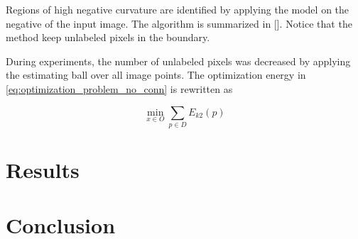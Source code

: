 \documentclass[runningheads]{llncs}
\begin{document}
		Regions of high negative curvature are identified by applying the model on the negative of the input image. The algorithm is summarized in []. Notice that the method keep unlabeled pixels in the boundary.
		
		During experiments, the number of unlabeled pixels was decreased by applying the estimating ball over all image points. The optimization energy in \eqref{eq:optimization_problem_no_conn} is rewritten as
		
	\begin{equation}
		\min_{x \in O} \sum_{p \in D}E_{k2}(p)
	\end{equation}			

\section{Results}

\section{Conclusion}


%
%
%


\end{document}
